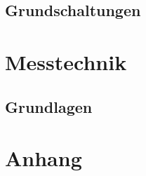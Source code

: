 \documentclass[a5paper]{report}
\begin{document}
		\chapter{Grundschaltungen}
		
		
	\part{Messtechnik}
	
		\chapter{Grundlagen}
		

%
%
\renewcommand{\indexname}{Sachregister}
\part{Anhang}
\printindex
\end{document}
